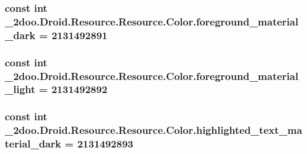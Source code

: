 \hypertarget{class__2doo_1_1_droid_1_1_resource_1_1_color_dfa4bdb32a669895743cac3e67381b89}{
\subsubsection[{foreground\_\-material\_\-dark}]{\setlength{\rightskip}{0pt plus 5cm}const int \_\-2doo.Droid.Resource.Resource.Color.foreground\_\-material\_\-dark = 2131492891}}
\label{class__2doo_1_1_droid_1_1_resource_1_1_color_dfa4bdb32a669895743cac3e67381b89}


\hypertarget{class__2doo_1_1_droid_1_1_resource_1_1_color_3ef5f2d8bb3b87495a455e5bb982ea47}{
\subsubsection[{foreground\_\-material\_\-light}]{\setlength{\rightskip}{0pt plus 5cm}const int \_\-2doo.Droid.Resource.Resource.Color.foreground\_\-material\_\-light = 2131492892}}
\label{class__2doo_1_1_droid_1_1_resource_1_1_color_3ef5f2d8bb3b87495a455e5bb982ea47}


\hypertarget{class__2doo_1_1_droid_1_1_resource_1_1_color_53282367f08ebb6afcf608a35620bbff}{
\subsubsection[{highlighted\_\-text\_\-material\_\-dark}]{\setlength{\rightskip}{0pt plus 5cm}const int \_\-2doo.Droid.Resource.Resource.Color.highlighted\_\-text\_\-material\_\-dark = 2131492893}}
\label{class__2doo_1_1_droid_1_1_resource_1_1_color_53282367f08ebb6afcf608a35620bbff}


